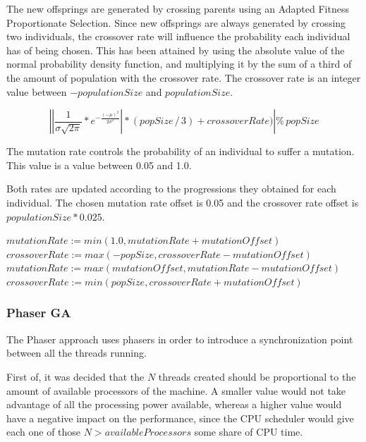 \documentclass[runningheads]{llncs}
\begin{document}
The new offsprings are generated by crossing parents using an Adapted Fitness Proportionate Selection. Since new offsprings are always generated by crossing two individuals, the crossover rate will influence the probability each individual has of being chosen. This has been attained by using the absolute value of the normal probability density function, and multiplying it by the sum of a third of the amount of population with the crossover rate. The crossover rate is an integer value between \(-populationSize\) and \(populationSize\).

\[ \left |\left | \frac{1}{\sigma \sqrt{2\pi}}*e^{-\frac{(-\mu)^2}{2\sigma^2}} \right | * (popSize\,/\,3) + crossoverRate)  \right | \%  \, popSize \]	

The mutation rate controls the probability of an individual to suffer a mutation. This value is a value between 0.05 and 1.0.

Both rates are updated according to the progressions they obtained for each individual. The chosen mutation rate offset is 0.05 and the crossover rate offset is \(populationSize * 0.025\).

\begin{algorithmic}
        \State $mutationRate := min(1.0, mutationRate + mutationOffset)$
        \State $crossoverRate := max(-popSize, crossoverRate - mutationOffset)$
\EndIf
{}
        \State $mutationRate := max(mutationOffset, mutationRate - mutationOffset)$
        \State $crossoverRate := min(popSize, crossoverRate + mutationOffset)$
\EndIf
\end{algorithmic}

\subsubsection{Phaser GA} \hfill \par

The Phaser approach uses phasers in order to introduce a synchronization point between all the threads running.

First of, it was decided that the \(N\) threads created should be proportional to the amount of available processors of the machine. A smaller value would not take advantage of all the processing power available, whereas a higher value would have a negative impact on the performance, since the CPU scheduler would give each one of those \(N > availableProcessors\) some share of CPU time.
\end{document}
